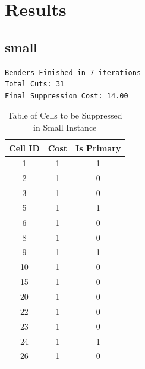 \documentclass[11pt,a4paper]{article}
\begin{document}
\section{Results}

\subsection{small}
\begin{lstlisting}
Benders Finished in 7 iterations
Total Cuts: 31
Final Suppression Cost: 14.00
\end{lstlisting}

\begin{table}[H]
    \centering
    \begin{tabular}{c | c | c}
        \textbf{Cell ID} & \textbf{Cost} & \textbf{Is Primary} \\
        \toprule
        1          & 1          & 1        \\
        2          & 1          & 0        \\
        3          & 1          & 0        \\ 
        5          & 1          & 1         \\
        6          & 1          & 0         \\
        8          & 1          & 0         \\
        9          & 1          & 1         \\
        10         & 1          & 0         \\
        15         & 1          & 0         \\
        20         & 1          & 0         \\
        22         & 1          & 0         \\
        23         & 1          & 0         \\
        24         & 1          & 1         \\
        26         & 1          & 0        \\
    \end{tabular}
    \caption{Table of Cells to be Suppressed in Small Instance}
    \label{tab:small-suppressed-cells}
\end{table}
\end{document}
